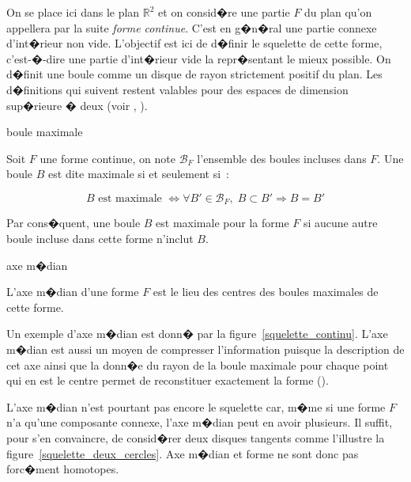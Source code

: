 On se place ici dans le plan $\mathbb{R}^2$ et on consid�re une partie $F$ du plan qu'on appellera par la suite \emph{forme continue}. C'est en g�n�ral une partie connexe d'int�rieur non vide. L'objectif est ici de d�finir le squelette de cette forme, c'est-�-dire une partie d'int�rieur vide la repr�sentant le mieux possible. On d�finit une boule comme un disque de rayon strictement positif du plan. Les d�finitions qui suivent restent valables pour des espaces de dimension sup�rieure � deux (voir , ).

        \begin{xdefinition}{boule maximale}
        \label{ske_def_boule_max}
        
        Soit $F$ une forme continue, on note $\mathcal{B}_F$ l'ensemble des boules incluses dans $F$. 
        Une boule $B$ est dite maximale si et seulement si~:
        
                        $$
                        B \text{ est maximale } \Longleftrightarrow \forall B' \in \mathcal{B}_F, 
                        \; B \subset B' \Longrightarrow B = B'
                        $$
        
        \end{xdefinition}

Par cons�quent, une boule $B$ est maximale pour la forme $F$ si aucune autre boule incluse dans cette forme n'inclut $B$.


            \begin{xdefinition}{axe m�dian}
            \label{ske_def_axe_med}

            L'axe m�dian d'une forme $F$ est le lieu des centres des boules maximales de cette forme.

            \end{xdefinition}


Un exemple d'axe m�dian est donn� par la figure~\ref{squelette_continu}. L'axe m�dian est aussi un moyen de compresser l'information puisque la description de cet axe ainsi que la donn�e du rayon de la boule maximale pour chaque point qui en est le centre permet de reconstituer exactement la forme ().


L'axe m�dian n'est pourtant pas encore le squelette car, m�me si une forme $F$ n'a qu'une composante connexe, l'axe m�dian peut en avoir plusieurs. Il suffit, pour s'en convaincre, de consid�rer deux disques tangents comme l'illustre la figure~\ref{squelette_deux_cercles}. Axe m�dian et forme ne sont donc pas forc�ment homotopes.



